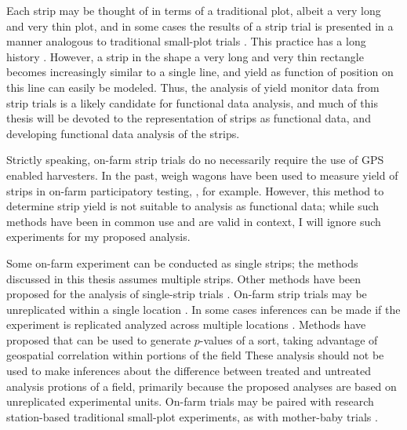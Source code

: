 \documentclass[phdcss]{SDSUThesis}
\begin{document}
Each strip may be thought of in terms of a traditional plot, albeit a very long and very thin plot, and in some cases the results of a strip trial is presented in a manner analogous to traditional small-plot trials \cite{kandel-2018, laurent-2022}. This practice has a long history \cite{wishart-1934}. However, a strip in the shape a very long and very thin rectangle becomes increasingly similar to a single line, and  yield as function of position on this line can easily be modeled. Thus, the analysis of yield monitor data from strip trials is a likely candidate for functional data analysis, and much of this thesis will be devoted to the representation of strips as functional data, and developing functional data analysis of the strips.


Strictly speaking, on-farm strip trials do no necessarily require the use of GPS enabled harvesters. In the past, weigh wagons have been used to measure yield of strips in on-farm participatory testing, \cite{nelson-06-2015, wuest-1994, yan-03-2002}, for example. However, this method to determine strip yield is not suitable to analysis as functional data; while such methods have been in common use and are valid in context, I will ignore such experiments for my proposed analysis. 

Some on-farm experiment can be conducted as single strips; the methods discussed in this thesis assumes multiple strips. Other methods have been proposed for the analysis of single-strip trials \cite{hatfield-06-2018, cho-2021}. On-farm strip trials may be unreplicated within a single location \cite{yan-03-2002, plant-2007, schmidt-04-2018}. In some cases inferences can be made if the experiment is replicated analyzed across multiple locations \cite{schmidt-04-2018, yan-03-2002}. Methods have proposed that can be used to generate $p$-values of a sort, taking advantage of geospatial correlation within portions of the field \cite{plant-2007, willers-01-2008} These analysis should not be used to make inferences about the difference between treated and untreated analysis protions of a field, primarily because the proposed analyses are based on unreplicated experimental units. On-farm trials may be paired with research station-based traditional small-plot experiments, as with mother-baby trials \cite{snapp-01-1999, virk-2008}.
\end{document}
